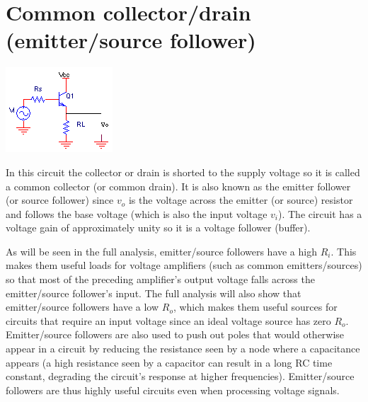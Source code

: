 \section{Common collector/drain (emitter/source follower)}
\begin{center}
	\includegraphics{schematics/basicemitterfollower.PNG}
\end{center}
\par
In this circuit the collector or drain is shorted to the supply voltage so it is called a common collector (or common drain). It is also known as the emitter follower (or source follower) since $v_{o}$ is the voltage across the emitter (or source) resistor and follows the base voltage (which is also the input voltage $v_{i}$). The circuit has a voltage gain of approximately unity so it is a voltage follower (buffer).
\par
As will be seen in the full analysis, emitter/source followers have a high $R_{i}$. This makes them useful loads for voltage amplifiers (such as common emitters/sources) so that most of the preceding amplifier's output voltage falls across the emitter/source follower's input. The full analysis will also show that emitter/source followers have a low $R_{o}$, which makes them useful sources for circuits that require an input voltage since an ideal voltage source has zero $R_{o}$. Emitter/source followers are also used to push out poles that would otherwise appear in a circuit by reducing the resistance seen by a node where a capacitance appears (a high resistance seen by a capacitor can result in a long RC time constant, degrading the circuit's response at higher frequencies). Emitter/source followers are thus highly useful circuits even when processing voltage signals.


